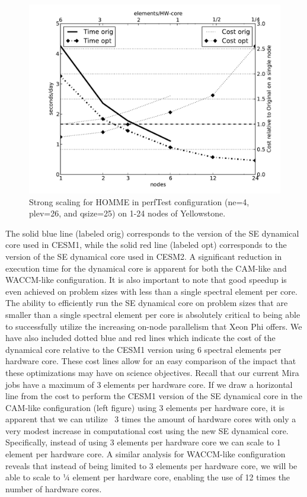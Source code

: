 \begin{figure}[]
 \begin{center}
\includegraphics[width=12.0cm]{figures/homme-ys-ne4-cam.pdf}
\end{center}
\caption{Strong scaling for HOMME in perfTest configuration (ne=4, plev=26, and qsize=25)  on 1-24 nodes of Yellowstone. }
\label{fig:homme-ys-ne4}
\end{figure}

The solid blue line (labeled orig) corresponds to the version of the SE dynamical core used in CESM1, while the solid red line (labeled opt) corresponds to the version of the SE dynamical core used in CESM2.  A significant reduction in execution time for the dynamical core is apparent for both the CAM-like and WACCM-like configuration.  It is also important to note that good speedup is even achieved on problem sizes with less than a single spectral element per core. The ability to efficiently run the SE dynamical core on problem sizes that are smaller than a single spectral element per core is absolutely critical to being able to successfully utilize the increasing on-node parallelism that Xeon Phi offers.  We have also included dotted blue and red lines which indicate the cost of the dynamical core relative to the CESM1 version using 6 spectral elements per hardware core.  These cost lines allow for an easy comparison of the impact that these optimizations may have on science objectives.  Recall that our current Mira jobs have a maximum of 3 elements per hardware core.  If we draw a horizontal line from the cost to perform the CESM1 version of the SE dynamical core in the CAM-like configuration (left figure) using 3 elements per hardware core, it is apparent that we can utilize ~3 times the amount of hardware cores with only a very modest increase in computational cost using the new SE dynamical core.  Specifically, instead of using 3 elements per hardware core we can scale to 1 element per hardware core.  A similar analysis for WACCM-like configuration reveals that instead of being limited to 3 elements per hardware core, we will be able to scale to ¼ element per hardware core, enabling the use of 12 times the number of hardware cores. 



